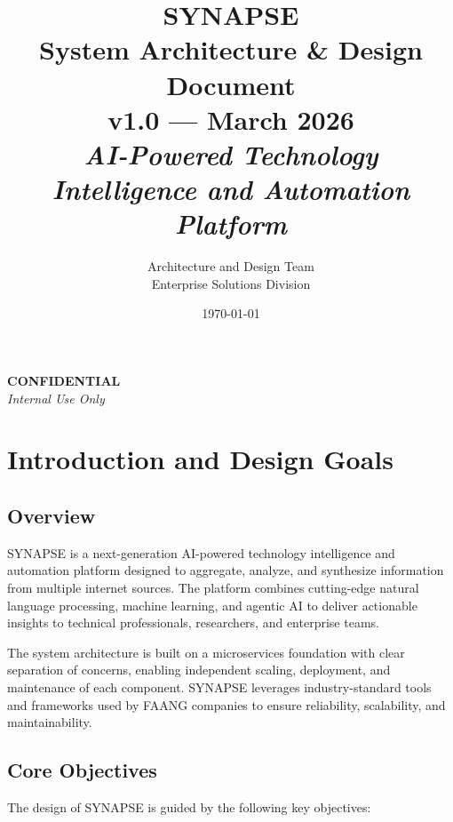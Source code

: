 \documentclass[12pt,a4paper]{report}
\title{
    \vspace{2cm}
    \huge{\textbf{SYNAPSE}} \\
    \Large{System Architecture \& Design Document} \\
    \vspace{1cm}
    \large{v1.0 --- March 2026} \\
    \vspace{3cm}
    \textit{AI-Powered Technology Intelligence and Automation Platform}
}
\author{
    Architecture and Design Team \\
    Enterprise Solutions Division
}
\date{\today}
\begin{document}
\maketitle
\vspace{3cm}

\begin{center}
    \Large{\textbf{CONFIDENTIAL}}\\
    \textit{Internal Use Only}
\end{center}

\thispagestyle{empty}
\newpage

\tableofcontents
\thispagestyle{empty}
\newpage

\listoffigures
\thispagestyle{empty}
\newpage

\chapter{Introduction and Design Goals}

\section{Overview}

SYNAPSE is a next-generation AI-powered technology intelligence and automation platform designed to aggregate, analyze, and synthesize information from multiple internet sources. The platform combines cutting-edge natural language processing, machine learning, and agentic AI to deliver actionable insights to technical professionals, researchers, and enterprise teams.

The system architecture is built on a microservices foundation with clear separation of concerns, enabling independent scaling, deployment, and maintenance of each component. SYNAPSE leverages industry-standard tools and frameworks used by FAANG companies to ensure reliability, scalability, and maintainability.

\section{Core Objectives}

The design of SYNAPSE is guided by the following key objectives:
\end{document}
